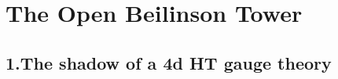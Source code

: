 %
%
%
%

\providecommand{\ChirHoch}{\operatorname{ChirHoch}}
\providecommand{\ChirAlg}{\operatorname{ChirAlg}}
\providecommand{\HTQFT}{\operatorname{HT\text{-}QFT}}
\providecommand{\Phihol}{\Phi_{\mathrm{hol}}}
\providecommand{\Face}{\operatorname{Face}}
\providecommand{\GRTone}{\operatorname{GRT}_1}
\providecommand{\kcat}{\kappa_{\mathrm{cat}}}
\providecommand{\kch}{\kappa_{\mathrm{ch}}}
\providecommand{\kBKM}{\kappa_{\mathrm{BKM}}}
\providecommand{\kfib}{\kappa_{\mathrm{fiber}}}
\providecommand{\SCchtopan}{\mathsf{SC}^{\mathrm{ch,top,an}}}
\providecommand{\Bbarch}{\bar{B}^{\mathrm{ch}}}
\providecommand{\Omegach}{\Omega^{\mathrm{ch}}}
\providecommand{\Kosz}{\operatorname{Kosz}}

\chapter*{The Open Beilinson Tower}
\label{ch:open-beilinson-tower-platonic}

\vspace{1em}

\section*{1.\quad The shadow of a 4d HT gauge theory}

